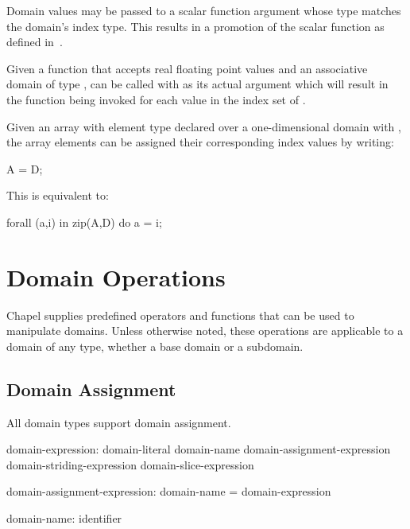 Domain values may be passed to a scalar function argument whose type
matches the domain's index type.  This results in a promotion of the
scalar function as defined in~.

\begin{example}
Given a function  that accepts real floating point values
and an associative domain  of
type ,  can be called with  as
its actual argument which will result in the function being invoked
for each value in the index set of .
\end{example}

\begin{example}
Given an array  with element type  declared over a
one-dimensional domain  with  , the
array elements can be assigned their corresponding index values by
writing:
\begin{chapel}
A = D;
\end{chapel}
This is equivalent to:
\begin{chapel}
forall (a,i) in zip(A,D) do
  a = i;
\end{chapel}
\end{example}


\section{Domain Operations}

Chapel supplies predefined operators and functions that can be used to manipulate
domains.  Unless otherwise noted, these operations are applicable to a domain of
any type, whether a base domain or a subdomain.

\subsection{Domain Assignment}
\label{Domain_Assignment}

All domain types support domain assignment.  

\begin{syntax}
domain-expression:
  domain-literal
  domain-name
  domain-assignment-expression
  domain-striding-expression
  domain-slice-expression


domain-assignment-expression:
  domain-name = domain-expression

domain-name:
  identifier
\end{syntax}

